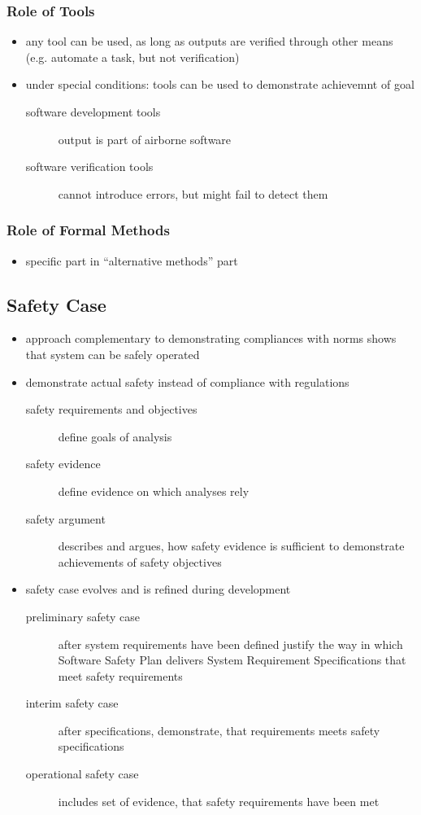 \documentclass[a4paper, 10pt]{article}
\begin{document}
\subsubsection*{Role of Tools}
\begin{itemize}
    \item any tool can be used, as long as outputs are verified through other means (e.g. automate a task, but not verification)
    \item under special conditions: tools can be used to demonstrate achievemnt of goal
    \begin{description}
        \item[software development tools] output is part of airborne software
        \item[software verification tools] cannot introduce errors, but might fail to detect them
    \end{description}
\end{itemize}

\subsubsection*{Role of Formal Methods}
\begin{itemize}
    \item specific part in ``alternative methods'' part
\end{itemize}

\subsection*{Safety Case}
\begin{itemize}
    \item approach complementary to demonstrating compliances with norms \follows shows that system can be safely operated
    \item demonstrate actual safety instead of compliance with regulations
    \begin{description}
        \item[safety requirements and objectives] define goals of analysis
        \item[safety evidence] define evidence on which analyses rely
        \item[safety argument] describes and argues, how safety evidence is sufficient to demonstrate achievements of safety objectives
    \end{description}
    \item safety case evolves and is refined during development
    \begin{description}
        \item[preliminary safety case] after system requirements have been defined \follows justify the way in which Software Safety Plan delivers System Requirement Specifications that meet safety requirements
        \item[interim safety case] after specifications, demonstrate, that requirements meets safety specifications
        \item[operational safety case] includes set of evidence, that safety requirements have been met
    \end{description}
\end{itemize}
\end{document}
